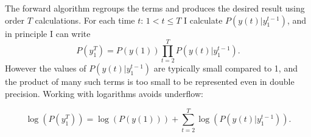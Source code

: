 \documentclass[]{article}
\newcommand{\ts}[3]{#1_{#2}^{#3}}                    %
\newcommand{\ti}[2]{{#1}{(#2)}}                  %
\begin{document}
The forward algorithm regroups the terms and produces the desired
result using order $T$ calculations.  For each time $t:\, 1 < t \leq
T$ I calculate $P(\ti{y}{t}|\ts{y}{1}{t-1})$, and in principle I can
write
\begin{equation*}
  P(\ts{y}{1}{T}) = P(\ti{y}{1}) \prod_{t=2}^T P(\ti{y}{t}|\ts{y}{1}{t-1}).
\end{equation*}
However the values of $P(\ti{y}{t}|\ts{y}{1}{t-1})$ are typically
small compared to 1, and the product of many such terms is too small
to be represented even in double precision.  Working with logarithms
avoids underflow:

\begin{equation}
  \label{eq:logP}
  \log\left( P(\ts{y}{1}{T}) \right) = \log\left( P(\ti{y}{1})
 \right) + \sum_{t=2}^T \log\left( P(\ti{y}{t}|\ts{y}{1}{t-1})\right).
\end{equation}

%
\newcommand{\alphax}[2]{%
  \tcboxmath[colback=white,colframe=cyan]{%
    P_{S(#1)|\ts{Y}{1}{#1}}\left(#2 |\ts{y}{1}{#1} \right)%
  }%
}%
\newcommand{\prealpha}{%
  \tcboxmath[colback=white,colframe=MyGreen]{%
    P_{\ti{S}{t}|\ts{Y}{1}{t-1}} \left(s | \ts{y}{1}{t-1} \right)%
  }%
}%
\newcommand{\gammax}{%
  \tcboxmath[colback=white,colframe=blue]{%
    P(\ti{y}{t}|\ts{y}{1}{t-1})%
  }%
}%
\newcommand{\pregamma}{%
  \tcboxmath[colback=white,colframe=red]{%
    P_{\ti{S}{t},\ti{Y}{t}|\ts{Y}{1}{t-1}} \left(s,\ti{y}{t}|\ts{y}{1}{t-1}\right)%
  }%
}%
\end{document}
